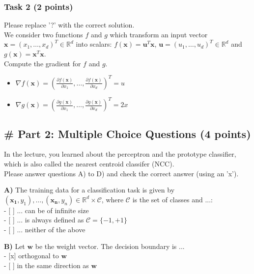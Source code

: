 \documentclass[11pt]{article}
\providecommand{\tightlist}{%
      \setlength{\itemsep}{0pt}\setlength{\parskip}{0pt}}
\begin{document}
    \subsubsection{Task 2 (2 points)}\label{task-2-2-points}

Please replace '?' with the correct solution.\\
We consider two functions \(f\) and \(g\) which transform an input
vector \(\mathbf{x} = (x_1, \dots , x_d)^T \in \mathbb{R}^d\) into
scalars: \(f(\mathbf{x}) = \mathbf{u}^T\mathbf{x}\),
\(\mathbf{u} = (u_1, \dots, u_d)^T \in \mathbb{R}^d\) and
\(g(\mathbf{x}) = \mathbf{x}^T\mathbf{x}\).\\
Compute the gradient for \(f\) and \(g\).

    \begin{itemize}
\tightlist
\item
  \(\nabla f(\mathbf{x}) = (\frac{\partial f(\mathbf{x})}{\partial x_1}, \dots, \frac{\partial f(\mathbf{x})}{\partial x_d})^T =u\)\\
\item
  \(\nabla g(\mathbf{x}) = (\frac{\partial g(\mathbf{x})}{\partial x_1}, \dots, \frac{\partial g(\mathbf{x})}{\partial x_d})^T =2x\)
\end{itemize}

    \subsection{\# Part 2: Multiple Choice Questions (4
points)}\label{part-2-multiple-choice-questions-4-points}

In the lecture, you learned about the perceptron and the prototype
classifier, which is also called the nearest centroid classifer (NCC).\\
Please answer questions A) to D) and check the correct answer (using an
'x').

    \textbf{A)} The training data for a classification task is given by
\((\mathbf{x_1}, y_1),\ldots, ( \mathbf{x_n}, y_n ) \in \mathbb{R}^d \times \mathcal{C}\),
where \(\mathcal{C}\) is the set of classes and ...:\\
- {[} {]} ... can be of infinite size\\
- {[} {]} ... is always defined as \(\mathcal{C} = \{-1,+1\}\)\\
- {[} {]} ... neither of the above

    \textbf{B)} Let \(\mathbf{w}\) be the weight vector. The decision
boundary is ...\\
- {[}x{]} orthogonal to \(\mathbf{w}\)\\
- {[} {]} in the same direction as \(\mathbf{w}\)
\end{document}
